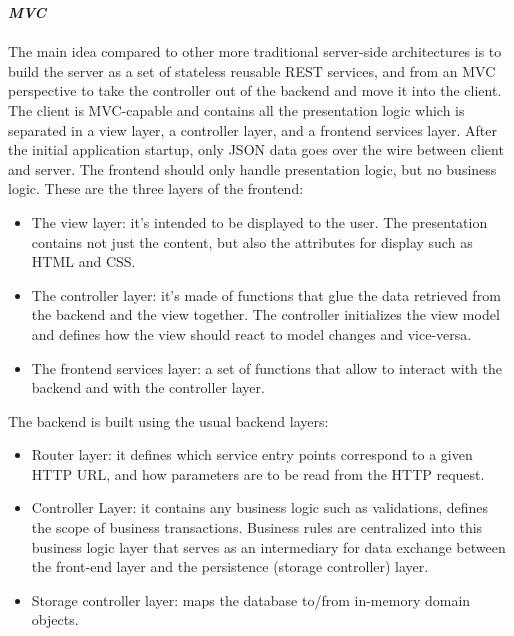 \begin{legal}
\begin{legal}
				\item \textit{\textbf{MVC}}\\\\
				The main idea compared to other more traditional server-side architectures is to build the server as a set of stateless reusable REST services, and from an MVC perspective to take the controller out of the backend and move it into the client.
				The client is MVC-capable and contains all the presentation logic which is separated in a view layer, a controller layer, and a frontend services layer. After the initial application startup, only JSON data goes over the wire between client and server.
				The frontend should only handle presentation logic, but no business logic. These are the three layers of the frontend:
				\begin{itemize}
					\item The view layer: it's intended to be displayed to the user. The presentation contains not just the content, but also the attributes for display such as HTML and CSS.
					\item The controller layer: it's made of functions that glue the data retrieved from the backend and the view together. The controller initializes the view model and defines how the view should react to model changes and vice-versa.
					\item The frontend services layer: a set of functions that allow to interact with the backend and with the controller layer.
				\end{itemize}
				The backend is built using the usual backend layers:
				\begin{itemize}
    				\item Router layer: it defines which service entry points correspond to a given HTTP URL, and how parameters are to be read from the HTTP request.
					\item Controller Layer: it contains any business logic such as validations, defines the scope of business transactions. Business rules are centralized into this business logic layer that serves as an intermediary for data exchange between the front-end layer and the persistence (storage controller) layer.
    				\item Storage controller layer: maps the database to/from in-memory domain objects.
				\end{itemize}
				\begin{figure}

\end{figure}
\end{legal}
\end{legal}

